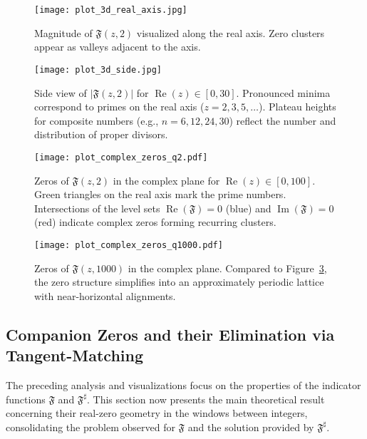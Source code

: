 \documentclass[11pt,a4paper]{amsart}
\DeclareMathOperator{\re}{Re}
\newcommand{\Fbase}{\mathfrak F}
\newcommand{\Fsharp}{\Fbase^{\sharp}}
\theoremstyle{plain}
\theoremstyle{definition}
\theoremstyle{remark}
\begin{document}
\begin{figure}[t]
\centering
\texttt{[image: plot\_3d\_real\_axis.jpg]}
\caption{Magnitude of $\mathfrak{F}(z,2)$ visualized along the real axis. Zero clusters appear as valleys adjacent to the axis.}
\label{fig:3d_real_axis}
\end{figure}

\begin{figure}[t]
\centering
\texttt{[image: plot\_3d\_side.jpg]}
\caption{Side view of $\lvert \mathfrak{F}(z,2)\rvert$ for $\re(z) \in [0, 30]$. Pronounced minima correspond to primes on the real axis ($z=2,3,5,\dots$). Plateau heights for composite numbers (e.g., $n=6,12,24,30$) reflect the number and distribution of proper divisors.}
\label{fig:3d_side_view}
\end{figure}

\begin{figure}[t]
\centering
\texttt{[image: plot\_complex\_zeros\_q2.pdf]}
\caption{Zeros of $\mathfrak{F}(z,2)$ in the complex plane for $\re(z) \in [0, 100]$. Green triangles on the real axis mark the prime numbers. Intersections of the level sets $\operatorname{Re}(\mathfrak{F})=0$ (blue) and $\operatorname{Im}(\mathfrak{F})=0$ (red) indicate complex zeros forming recurring clusters.}
\label{fig:complex_zeros_low_q}
\end{figure}

\begin{figure}[t]
\centering
\texttt{[image: plot\_complex\_zeros\_q1000.pdf]}
\caption{Zeros of $\mathfrak{F}(z,1000)$ in the complex plane. Compared to Figure~\ref{fig:complex_zeros_low_q}, the zero structure simplifies into an approximately periodic lattice with near-horizontal alignments.}
\label{fig:complex_zeros_high_q}
\end{figure}

\FloatBarrier



\subsection{Companion Zeros and their Elimination via Tangent-Matching}
The preceding analysis and visualizations focus on the properties of the indicator functions $\mathfrak{F}$ and $\Fsharp$. This section now presents the main theoretical result concerning their real-zero geometry in the windows between integers, consolidating the problem observed for $\mathfrak{F}$ and the solution provided by $\Fsharp$.
\end{document}

